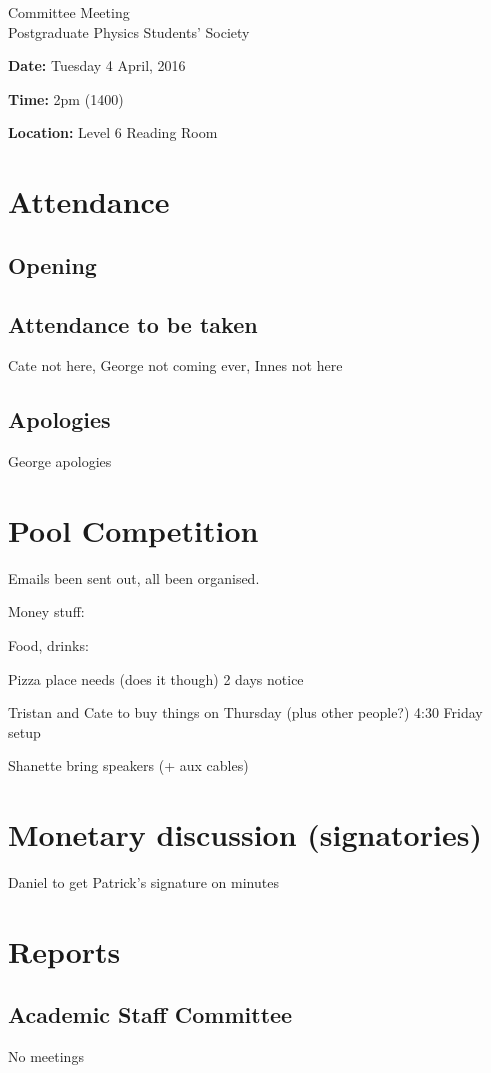 \documentclass[a4paper,11pt]{article}
\begin{document}
    \begin{center}
		\Huge Committee Meeting\\
		\Huge Postgraduate Physics Students' Society\\[0.5cm]
		\large
        \raggedright \textbf{Date:} Tuesday 4 April, 2016\\
        \raggedright \textbf{Time:} 2pm (1400)\\
        \raggedright \textbf{Location:} Level 6 Reading Room\\[0.5cm]
    \end{center}
\section{Attendance}
\subsection{Opening}
\subsection{Attendance to be taken}
Cate not here, George not coming ever, Innes not here
\subsection{Apologies}
George apologies
\section{Pool Competition}
Emails been sent out, all been organised.

Money stuff: 

Food, drinks:

Pizza place needs (does it though) 2 days notice

Tristan and Cate to buy things on Thursday (plus other people?)
4:30 Friday setup

Shanette bring speakers (+ aux cables)


\section{Monetary discussion (signatories)}
Daniel to get Patrick's signature on minutes

\section{Reports}
\subsection{Academic Staff Committee}
No meetings
\end{document}
